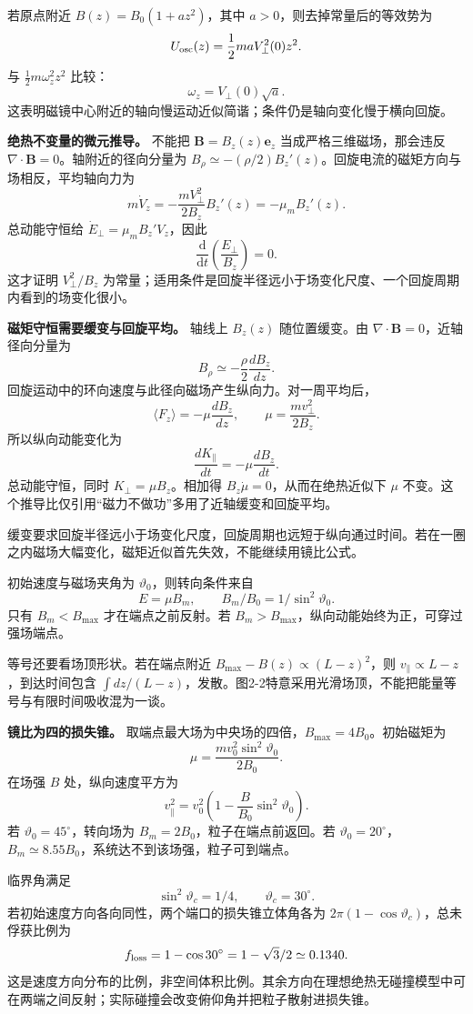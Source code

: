 \documentclass[12pt,a4paper,UTF8]{ctexart}
\begin{document}
若原点附近 \(B(z)=B_0(1+az^2)\)，其中 \(a>0\)，则去掉常量后的等效势为 \[
U_{\rm osc}(z)=\frac12maV_\perp^2(0)z^2.
\] 与 \(\frac12m\omega_z^2z^2\) 比较： \[
\boxed{\omega_z=V_\perp(0)\sqrt a}.
\]
这表明磁镜中心附近的轴向慢运动近似简谐；条件仍是轴向变化慢于横向回旋。

\textbf{绝热不变量的微元推导。} 不能把 \(\bm B=B_z(z)\bm e_z\)
当成严格三维磁场，那会违反 \(\nabla\cdot\bm B=0\)。轴附近的径向分量为
\(B_\rho\simeq-(\rho/2)B_z'(z)\)。回旋电流的磁矩方向与场相反，平均轴向力为
\[
m\dot V_z=-\frac{mV_\perp^2}{2B_z}B_z'(z)=-\mu_mB_z'(z).
\] 总动能守恒给 \(\dot E_\perp=\mu_mB_z'V_z\)，因此 \[
\frac{\mathrm d}{\mathrm dt}\left(\frac{E_\perp}{B_z}\right)=0.
\] 这才证明 \(V_\perp^2/B_z\)
为常量；适用条件是回旋半径远小于场变化尺度、一个回旋周期内看到的场变化很小。

\textbf{磁矩守恒需要缓变与回旋平均。} 轴线上 \(B_z(z)\) 随位置缓变。由
\(\nabla\cdot\bm B=0\)，近轴径向分量为 \[
B_\rho\simeq-\frac\rho2\frac{dB_z}{dz}.
\] 回旋运动中的环向速度与此径向磁场产生纵向力。对一周平均后， \[
\langle F_z\rangle=-\mu\frac{dB_z}{dz},\qquad
\mu=\frac{mv_\perp^2}{2B_z}.
\] 所以纵向动能变化为 \[
\frac{dK_\parallel}{dt}=-\mu\frac{dB_z}{dt}.
\] 总动能守恒，同时 \(K_\perp=\mu B_z\)。相加得
\(B_z\dot\mu=0\)，从而在绝热近似下 \(\mu\)
不变。这个推导比仅引用``磁力不做功''多用了近轴缓变和回旋平均。

缓变要求回旋半径远小于场变化尺度，回旋周期也远短于纵向通过时间。若在一圈之内磁场大幅变化，磁矩近似首先失效，不能继续用镜比公式。

初始速度与磁场夹角为 \(\vartheta_0\)，则转向条件来自 \[
E=\mu B_m,\qquad B_m/B_0=1/\sin^2\vartheta_0.
\] 只有 \(B_m<B_{\max}\) 才在端点之前反射。若
\(B_m>B_{\max}\)，纵向动能始终为正，可穿过强场端点。

等号还要看场顶形状。若在端点附近 \(B_{\max}-B(z)\propto(L-z)^2\)，则
\(v_\parallel\propto L-z\)，到达时间包含
\(\int dz/(L-z)\)，发散。图2-2特意采用光滑场顶，不能把能量等号与有限时间吸收混为一谈。

\textbf{镜比为四的损失锥。}
取端点最大场为中央场的四倍，\(B_{\max}=4B_0\)。初始磁矩为 \[
\mu=\frac{mv_0^2\sin^2\vartheta_0}{2B_0}.
\] 在场强 \(B\) 处，纵向速度平方为 \[
v_\parallel^2=v_0^2\left(1-\frac B{B_0}\sin^2\vartheta_0\right).
\] 若 \(\vartheta_0=45^\circ\)，转向场为
\(B_m=2B_0\)，粒子在端点前返回。若
\(\vartheta_0=20^\circ\)，\(B_m\simeq8.55B_0\)，系统达不到该场强，粒子可到端点。

临界角满足 \[
\sin^2\vartheta_c=1/4,\qquad\vartheta_c=30^\circ.
\] 若初始速度方向各向同性，两个端口的损失锥立体角各为
\(2\pi(1-\cos\vartheta_c)\)，总未俘获比例为 \[
f_{\rm loss}=1-\cos30^\circ=1-\sqrt3/2\simeq0.1340.
\]
这是速度方向分布的比例，非空间体积比例。其余方向在理想绝热无碰撞模型中可在两端之间反射；实际碰撞会改变俯仰角并把粒子散射进损失锥。
\end{document}
